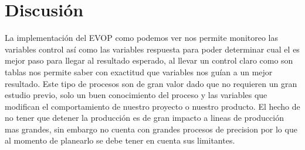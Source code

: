 \section{Discusión}

La implementación del EVOP como podemos ver nos permite monitoreo las variables control así como las variables respuesta para poder determinar cual el es mejor paso para llegar al resultado esperado, al llevar un control claro como son tablas nos permite saber con exactitud que variables nos guían a un mejor resultado. Este tipo de procesos son de gran valor dado que no requieren un gran estudio previo, solo un buen conocimiento del proceso y las variables que modifican el comportamiento de nuestro proyecto o nuestro producto.
El hecho de no tener que detener la producción es de gran impacto a lineas de producción mas grandes, sin embargo no cuenta con grandes procesos de precision por lo que al momento de planearlo se debe tener en cuenta sus limitantes.